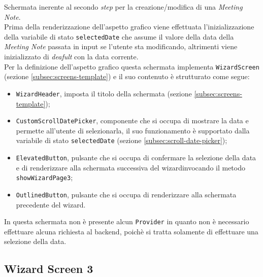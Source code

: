 Schermata inerente al secondo \emph{step} per la creazione/modifica di una \emph{Meeting Note}. \\
Prima della renderizzazione dell'aspetto grafico viene effettuata l'inizializzazione della variabile di stato \lstinline{selectedDate} che assume il valore della data della \emph{Meeting Note} passata in input se l'utente sta modificando, altrimenti viene inizializzato di \emph{deafult} con la data corrente. \\
Per la definizione dell'aspetto grafico questa schermata implementa \lstinline{WizardScreen} (sezione \ref{subsec:screens-template}) e il suo contenuto è strutturato come segue:
\begin{itemize}
    \item \lstinline{WizardHeader}, imposta il titolo della schermata (sezione \ref{subsec:screens-template});
    \item \lstinline{CustomScrollDatePicker}, componente che si occupa di mostrare la data e permette all'utente di selezionarla, il suo funzionamento è supportato dalla variabile di stato \lstinline{selectedDate} (sezione \ref{subsec:scroll-date-picker});
    \item \lstinline{ElevatedButton}\cite{site:elevated-button}, pulsante che si occupa di confermare la selezione della data e di renderizzare alla schermata successiva del \gls{wizard}\glsoccur invocando il metodo \lstinline{showWizardPage3};
    \item \lstinline{OutlinedButton}\cite{site:outline-button}, pulsante che si occupa di renderizzare alla schermata precedente del \gls{wizard}\glsoccur.
\end{itemize}
In questa schermata non è presente alcun \lstinline{Provider} in quanto non è necessario effettuare alcuna richiesta al \gls{backend}\glsoccur, poichè si tratta solamente di effettuare una selezione della data.


\subsection{Wizard Screen 3}
\label{subsec:wizard-screen-3}

